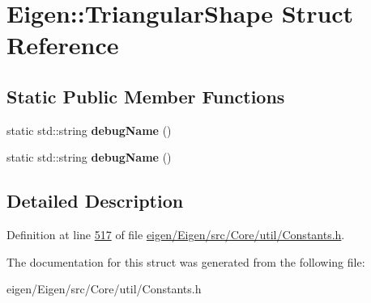 \hypertarget{struct_eigen_1_1_triangular_shape}{}\section{Eigen\+:\+:Triangular\+Shape Struct Reference}
\label{struct_eigen_1_1_triangular_shape}
\subsection*{Static Public Member Functions}
\begin{DoxyCompactItemize}
\item 
\mbox{\label{struct_eigen_1_1_triangular_shape_a6c43155ceddf7ca3176df0976fb531db}} 
static std\+::string {\bfseries debug\+Name} ()
\item 
\mbox{\label{struct_eigen_1_1_triangular_shape_a6c43155ceddf7ca3176df0976fb531db}} 
static std\+::string {\bfseries debug\+Name} ()
\end{DoxyCompactItemize}


\subsection{Detailed Description}


Definition at line \hyperlink{eigen_2_eigen_2src_2_core_2util_2_constants_8h_source_l00517}{517} of file \hyperlink{eigen_2_eigen_2src_2_core_2util_2_constants_8h_source}{eigen/\+Eigen/src/\+Core/util/\+Constants.\+h}.



The documentation for this struct was generated from the following file\+:\begin{DoxyCompactItemize}
\item 
eigen/\+Eigen/src/\+Core/util/\+Constants.\+h\end{DoxyCompactItemize}
